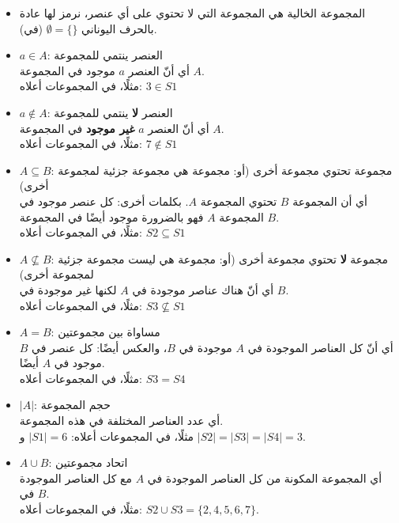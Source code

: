 ﻿\documentclass[12pt]{article}
\begin{document}
\begin{itemize}
\item المجموعة الخالية هي المجموعة التي لا تحتوي على أي عنصر، نرمز لها عادة بالحرف اليوناني $\emptyset = \{\}$ (في).

\item $a \in A$: العنصر ينتمي للمجموعة\\
أي أنّ العنصر $a$ موجود في المجموعة $A$. \\
مثلًا، في المجموعات أعلاه: $3 \in S1$

\item $a \notin A$: العنصر \textbf{لا} ينتمي للمجموعة \\
أي أنّ العنصر $a$ \textbf{غير موجود} في المجموعة $A$. \\
مثلًا، في المجموعات أعلاه: $7 \notin S1$

\item $A \subseteq B$: مجموعة تحتوي مجموعة أخرى (أو: مجموعة هي مجموعة جزئية لمجموعة أخرى) \\
أي أن المجموعة $B$ تحتوي المجموعة $A$. بكلمات أخرى: كل عنصر موجود في المجموعة $A$ فهو بالضرورة موجود أيضًا في المجموعة $B$.\\
مثلًا، في المجموعات أعلاه: $S2 \subseteq S1$

\item $A \nsubseteq B$: مجموعة \textbf{لا} تحتوي مجموعة أخرى (أو: مجموعة هي ليست مجموعة جزئية لمجموعة أخرى) \\
أي أنّ هناك عناصر موجودة في $A$ لكنها غير موجودة في $B$. \\
مثلًا، في المجموعات أعلاه: $S3 \nsubseteq S1$

\item $A = B$: مساواة بين مجموعتين \\
أي أنّ كل العناصر الموجودة في $A$ موجودة في $B$، والعكس أيضًا: كل عنصر في $B$ موجود في $A$ أيضًا. \\
مثلًا، في المجموعات أعلاه: $S3 = S4$

\item $|A|$: حجم المجموعة \\
أي عدد العناصر المختلفة في هذه المجموعة. \\
مثلًا، في المجموعات أعلاه: $|S1| = 6$ و $|S2| = |S3| = |S4| = 3$.

\item $A \cup B$: اتحاد مجموعتين \\
أي المجموعة المكونة من كل العناصر الموجودة في $A$ مع كل العناصر الموجودة في $B$. \\
مثلًا، في المجموعات أعلاه: $S2 \cup S3 = \{2, 4, 5, 6, 7 \}$.


\end{itemize}
\end{document}
